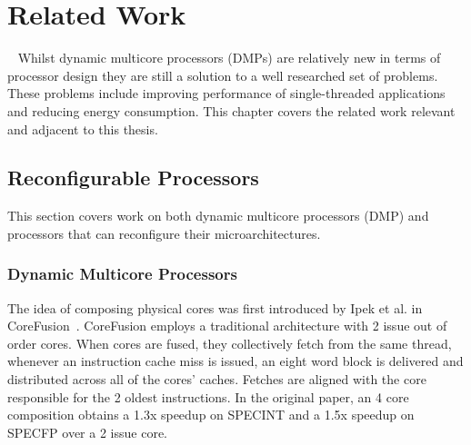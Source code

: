 \chapter{Related Work}~\label{chp:rw}
Whilst dynamic multicore processors (DMPs) are relatively new in terms of processor design they are still a solution to a well researched set of problems.
These problems include improving performance of single-threaded applications and reducing energy consumption.
This chapter covers the related work relevant and adjacent to this thesis.

\section{Reconfigurable Processors}

This section covers work on both dynamic multicore processors (DMP) and processors that can reconfigure their microarchitectures.

\subsection{Dynamic Multicore Processors}
The idea of composing physical cores was first introduced by Ipek et al. in CoreFusion~\cite{ipek2007CoreFusion}.
CoreFusion employs a traditional architecture with 2 issue out of order cores.
When cores are fused, they collectively fetch from the same thread, whenever an instruction cache miss is issued, an eight word block is delivered and distributed across all of the cores' caches.
Fetches are aligned with the core responsible for the 2 oldest instructions.
In the original paper, an 4 core composition obtains a 1.3x speedup on SPECINT and a 1.5x speedup on SPECFP over a 2 issue core.
 
